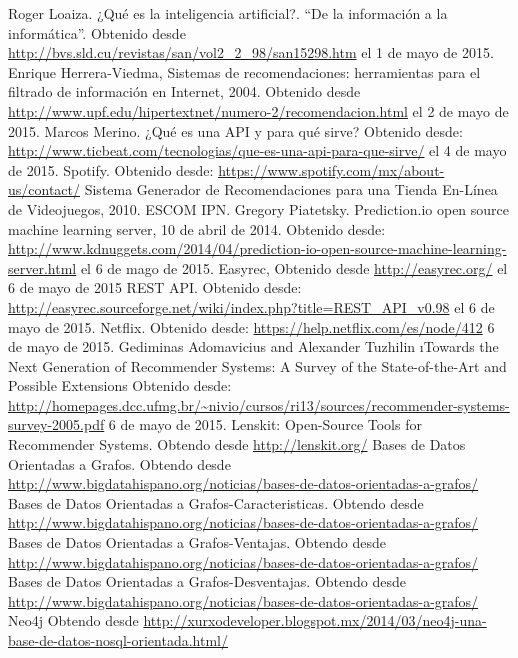 \begin{thebibliography}{1}

    Roger Loaiza. ¿Qué es la inteligencia artificial?. “De la información a la informática”. Obtenido desde \url{http://bvs.sld.cu/revistas/san/vol2_2_98/san15298.htm} el 1 de mayo de 2015.
    Enrique Herrera-Viedma, Sistemas de recomendaciones: herramientas para el filtrado de información en Internet, 2004. Obtenido desde \url{http://www.upf.edu/hipertextnet/numero-2/recomendacion.html} el 2 de mayo de 2015. 
     Marcos Merino. ¿Qué es una API y para qué sirve? Obtenido desde: \url{http://www.ticbeat.com/tecnologias/que-es-una-api-para-que-sirve/} el 4 de mayo de 2015. 
     Spotify. Obtenido desde: \url{https://www.spotify.com/mx/about-us/contact/}
     Sistema Generador de Recomendaciones para una Tienda En-Línea de Videojuegos, 2010. ESCOM IPN. 
    Gregory Piatetsky. Prediction.io open source machine learning server, 10 de abril de 2014. Obtenido desde: \url{http://www.kdnuggets.com/2014/04/prediction-io-open-source-machine-learning-server.html} el 6 de mago de 2015. 
    Easyrec, Obtenido desde \url{http://easyrec.org/} el 6 de mayo de 2015 
    REST API. Obtenido desde: \url{http://easyrec.sourceforge.net/wiki/index.php?title=REST_API_v0.98} el 6 de mayo de 2015. 
    Netflix. Obtenido desde: \url{https://help.netflix.com/es/node/412} 6 de mayo de 2015.
    Gediminas Adomavicius and Alexander Tuzhilin \i{Towards the Next Generation of Recommender Systems: A Survey of the State-of-the-Art and Possible Extensions} Obtenido desde: \url{http://homepages.dcc.ufmg.br/~nivio/cursos/ri13/sources/recommender-systems-survey-2005.pdf} 6 de mayo de 2015.
    Lenskit: Open-Source Tools for Recommender Systems. Obtendo desde \url{http://lenskit.org/}
    Bases de Datos Orientadas a Grafos. Obtendo desde \url{http://www.bigdatahispano.org/noticias/bases-de-datos-orientadas-a-grafos/}	
    Bases de Datos Orientadas a Grafos-Caracteristicas. Obtendo desde \url{http://www.bigdatahispano.org/noticias/bases-de-datos-orientadas-a-grafos/}	
    Bases de Datos Orientadas a Grafos-Ventajas. Obtendo desde \url{http://www.bigdatahispano.org/noticias/bases-de-datos-orientadas-a-grafos/}	
    Bases de Datos Orientadas a Grafos-Desventajas. Obtendo desde \url{http://www.bigdatahispano.org/noticias/bases-de-datos-orientadas-a-grafos/}
    Neo4j Obtendo desde \url{http://xurxodeveloper.blogspot.mx/2014/03/neo4j-una-base-de-datos-nosql-orientada.html/}

\end{thebibliography}
